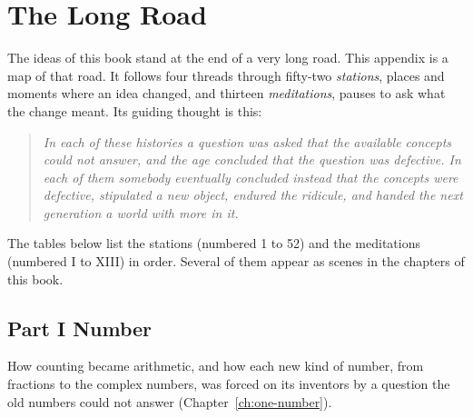 \chapter{The Long Road}\label{app:long-road}

The ideas of this book stand at the end of a very long road. This appendix is a map of that road. It follows four threads through fifty-two \emph{stations}, places and moments where an idea changed, and thirteen \emph{meditations}, pauses to ask what the change meant. Its guiding thought is this:
\begin{quote}
\itshape In each of these histories a question was asked that the available concepts could not answer, and the age concluded that the question was defective. In each of them somebody eventually concluded instead that the concepts were defective, stipulated a new object, endured the ridicule, and handed the next generation a world with more in it.
\end{quote}

The tables below list the stations (numbered 1 to 52) and the meditations (numbered I to XIII) in order. Several of them appear as scenes in the chapters of this book.

\section*{Part I \quad Number}

How counting became arithmetic, and how each new kind of number, from fractions to the complex numbers, was forced on its inventors by a question the old numbers could not answer (Chapter~\ref{ch:one-number}).

